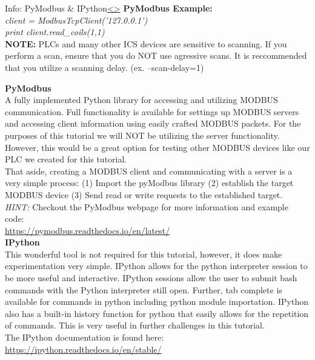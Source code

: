 \documentclass[12pt]{extarticle}
\newenvironment{instructionblock}{\Large\bgroup}{\egroup}
\newcounter{next}
\newcounter{prev}
\begin{document}

\pagebreak
{}
\begin{slide}{Info: PyModbus \& IPython}{\hyperref[slide \theprev]{\textless}\hyperref[slide \thenext]{\textgreater}}
\begin{instructionblock}
\textbf{PyModbus Example:} \\
\textit{client = ModbusTcpClient('127.0.0.1')}\\
\textit{print client.read\_coils(1,1)}\\
\vfill
\noindent
\textbf{NOTE: }PLCs and many other ICS devices are sensitive to scanning. If you perform a scan, ensure that you do NOT use agressive scans. It is reccommended that you utilize a scanning delay. (ex. --scan-delay=1)
\end{instructionblock}
\end{slide}
\vfill
\noindent
\textbf{PyModbus}\\
A fully implemented Python library for accessing and utilizing MODBUS communication. Full functionality is available for settings up MODBUS servers and accessing client information using easily crafted MODBUS packets. For the purposes of this tutorial we will NOT be utilizing the server functionality. However, this would be a great option for testing other MODBUS devices like our PLC we created for this tutorial.\\
That aside, creating a MODBUS client and communicating with a server is a very simple process: (1) Import the pyModbus library (2) establish the target MODBUS device (3) Send read or write requests to the established target.\\
\textit{HINT:} Checkout the PyModbus webpage for more information and example code:\\ \url{https://pymodbus.readthedocs.io/en/latest/}\\
\textbf{IPython}\\
This wonderful tool is not required for this tutorial, however, it does make experimentation very simple. IPython allows for the python interpreter session to be more useful and interactive. IPython sessions allow the user to submit bash commands with the Python interpreter still open. Further, tab complete is available for commands in python including python module importation. IPython also has a built-in history function for python that easily allows for the repetition of commands. This is very useful in further challenges in this tutorial.\\
The IPython documentation is found here:\\
\url{https://ipython.readthedocs.io/en/stable/}
\end{document}
